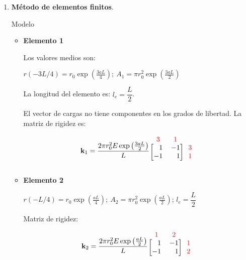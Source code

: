 \begin{example}
\begin{enumerate}[label=\textbf{\arabic*}.]
\item \textbf{Método de elementos finitos}.

\begin{marginfigure}[-1cm]
\centering
{}
\caption{Modelo}
\end{marginfigure}

\begin{itemize}
\item \textbf{Elemento 1}

Los valores medios son:

$r(-3L/4) = r_0 \exp \left(\frac{3aL}{4}\right); \ A_1 = \pi r_0^2 \exp \left(\frac{3aL}{2}\right)$

La longitud del elemento es: $l_e = \dfrac{L}{2}$.

El vector de cargas no tiene componentes en los grados de libertad. La matriz de rigidez es:

$$\mathbf{k}_1 = \dfrac{2\pi r_0^2 E \exp \left(\frac{3aL}{2}\right)}{L} \begin{blockarray}{ccc}
	\color{red} 3 & \color{red} 1\\
	\begin{block}{[rr]c}
		1 & -1 & \color{red} 3\\
		-1 & 1 & \color{red} 1\\
	\end{block}
\end{blockarray}$$

\item \textbf{Elemento 2}

$ r(-L/4) = r_0 \exp \left(\frac{aL}{4}\right); \ A_2 = \pi r_0^2 \exp \left(\frac{aL}{2}\right); \, l_e = \dfrac{L}{2} $

Matriz de rigidez:

$$\mathbf{k}_2 = \dfrac{2\pi r_0^2 E \exp \left(\frac{aL}{2}\right)}{L} \begin{blockarray}{ccc}
	\color{red} 1 & \color{red} 2\\
	\begin{block}{[rr]c}
		1 & -1 & \color{red} 1\\
		-1 & 1 & \color{red} 2\\
	\end{block}
\end{blockarray}$$


\end{itemize}
\end{enumerate}
\end{example}
